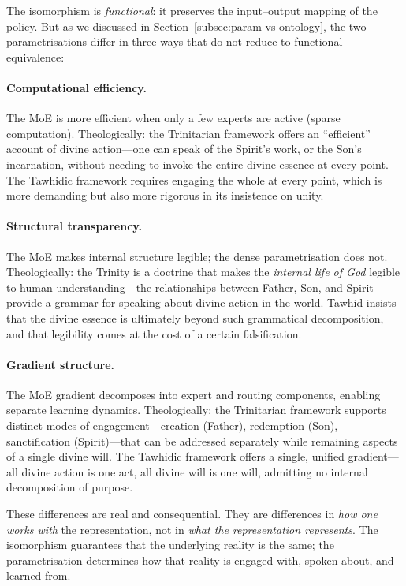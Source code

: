 The isomorphism is \emph{functional}: it preserves the input--output mapping of the policy. But as we discussed in Section~\ref{subsec:param-vs-ontology}, the two parametrisations differ in three ways that do not reduce to functional equivalence:

\paragraph{Computational efficiency.} The MoE is more efficient when only a few experts are active (sparse computation). Theologically: the Trinitarian framework offers an ``efficient'' account of divine action---one can speak of the Spirit's work, or the Son's incarnation, without needing to invoke the entire divine essence at every point. The Tawhidic framework requires engaging the whole at every point, which is more demanding but also more rigorous in its insistence on unity.

\paragraph{Structural transparency.} The MoE makes internal structure legible; the dense parametrisation does not. Theologically: the Trinity is a doctrine that makes the \emph{internal life of God} legible to human understanding---the relationships between Father, Son, and Spirit provide a grammar for speaking about divine action in the world. Tawhid insists that the divine essence is ultimately beyond such grammatical decomposition, and that legibility comes at the cost of a certain falsification.

\paragraph{Gradient structure.} The MoE gradient decomposes into expert and routing components, enabling separate learning dynamics. Theologically: the Trinitarian framework supports distinct modes of engagement---creation (Father), redemption (Son), sanctification (Spirit)---that can be addressed separately while remaining aspects of a single divine will. The Tawhidic framework offers a single, unified gradient---all divine action is one act, all divine will is one will, admitting no internal decomposition of purpose.

These differences are real and consequential. They are differences in \emph{how one works with} the representation, not in \emph{what the representation represents}. The isomorphism guarantees that the underlying reality is the same; the parametrisation determines how that reality is engaged with, spoken about, and learned from.

